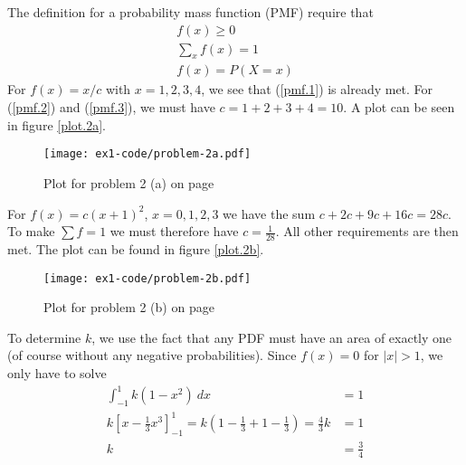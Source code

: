 \documentclass[a4paper,english,12pt]{article}
\begin{document}
The definition for a probability mass function (PMF) require that
\begin{gather}
  f(x) \geqslant 0 \label{pmf.1} \\
  \sum_x{f(x)} = 1 \label{pmf.2} \\
  f(x) = P(X=x) \label{pmf.3}
\end{gather}
For $f(x) = x/c$ with $x=1,2,3,4$, we see that (\ref{pmf.1}) is already met.
For (\ref{pmf.2}) and (\ref{pmf.3}), we must have $c=1+2+3+4=10$. A plot can be
seen in figure \vref{plot.2a}.

\begin{figure}[h]
  \texttt{[image: ex1-code/problem-2a.pdf]}
  \caption{Plot for problem 2 (a) on page \pageref{problem.2 (a)}}
  \label{plot.2a}
\end{figure}

For $f(x) = c(x+1)^2$, $x=0,1,2,3$ we have the sum $c+2c+9c+16c=28c$. To make
$\sum{f}=1$ we must therefore have $c=\frac{1}{28}$. All other requirements are
then met. The plot can be found in figure \vref{plot.2b}.

\begin{figure}[h]
  \texttt{[image: ex1-code/problem-2b.pdf]}
  \caption{Plot for problem 2 (b) on page \pageref{problem.2 (b)}}
  \label{plot.2b}
\end{figure}



To determine $k$, we use the fact that any PDF must have an area of exactly one
(of course without any negative probabilities). Since $f(x) = 0$ for $|x|
> 1$, we only have to solve
\begin{align*}
  \int_{-1}^{1}{k(1-x^2)~dx} &= 1 \\
  k\left[ x - \frac{1}{3}{x^3} \right]_{-1}^{1} =
  k\left( 1 - \frac{1}{3} + 1 - \frac{1}{3} \right) = \frac{4}{3}k &= 1 \\
   k &= \frac{3}{4}
\end{align*}







\end{document}
